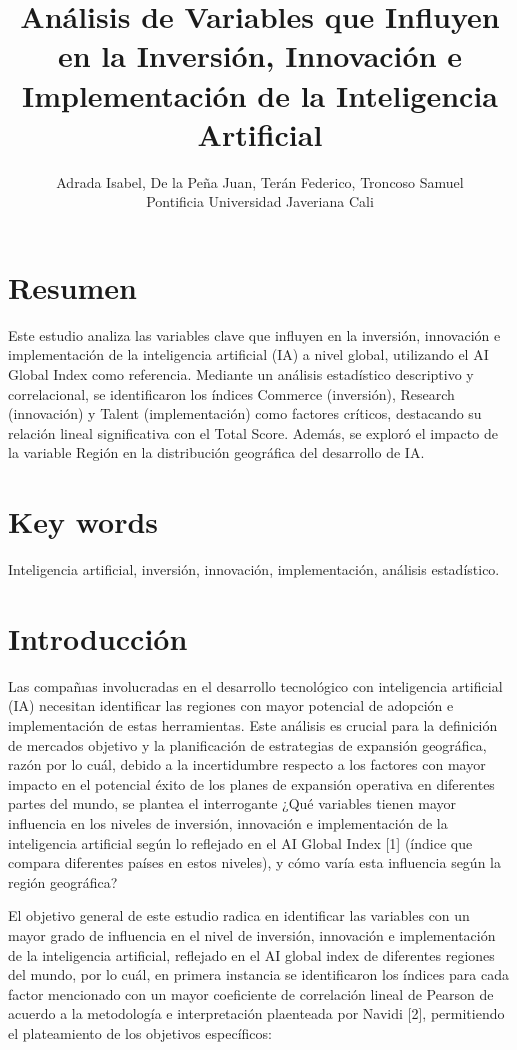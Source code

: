 \documentclass[
]{article}
\title{Análisis de Variables que Influyen en la Inversión, Innovación e
Implementación de la Inteligencia Artificial}
\author{Adrada Isabel, De la Peña Juan, Terán Federico, Troncoso
Samuel\\
Pontificia Universidad Javeriana Cali}
\date{}
\begin{document}
\maketitle

\begin{multicols}{2}

\section{Resumen}
Este estudio analiza las variables clave que influyen en la inversión, innovación e implementación de la inteligencia artificial (IA) a nivel global, utilizando el AI Global Index como referencia. Mediante un análisis estadístico descriptivo y correlacional, se identificaron los índices Commerce (inversión), Research (innovación) y Talent (implementación) como factores críticos, destacando su relación lineal significativa con el Total Score. Además, se exploró el impacto de la variable Región en la distribución geográfica del desarrollo de IA.

\section{Key words}
Inteligencia artificial, inversión, innovación, implementación, análisis estadístico.

\section{Introducción}
Las compañıas involucradas en el desarrollo tecnológico con inteligencia artificial (IA) necesitan identificar las regiones con mayor potencial de adopción e implementación de estas herramientas. Este análisis es crucial para la definición de mercados objetivo y la planificación de estrategias de expansión geográfica, razón por lo cuál, debido a la incertidumbre respecto a los factores con mayor impacto en el potencial éxito de los planes de expansión operativa en diferentes partes del mundo, se plantea el interrogante ¿Qué variables tienen mayor influencia en los niveles de inversión, innovación e implementación de la inteligencia artificial según lo reflejado en el AI Global Index [1] (índice que compara diferentes países en estos niveles), y cómo varía esta influencia según la región geográfica?

El objetivo general de este estudio radica en identificar las variables con un mayor grado de influencia en el nivel de inversión, innovación e implementación de la inteligencia artificial, reflejado en el AI global index de diferentes regiones del mundo, por lo cuál, en primera instancia se identificaron los índices para cada factor mencionado con un mayor coeficiente de correlación lineal de Pearson de acuerdo a la metodología e interpretación plaenteada por Navidi [2], permitiendo el plateamiento de los objetivos específicos:


\end{multicols}
\end{document}
